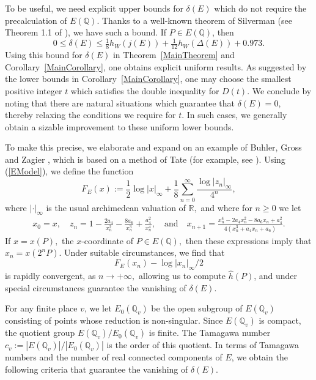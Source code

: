 \documentclass[12pt]{amsart}
\newcommand{\Q}{\mathbb{Q}}
\newcommand{\R}{\mathbb{R}}
\numberwithin{equation}{section}
\begin{document}
To be useful, we need  explicit upper bounds for $\delta(E)$ which do not require the precalculation
of $E(\Q)$. Thanks to a
well-known theorem of Silverman (see Theorem 1.1 of \cite{Silverman}), we have such a bound.
If $P\in E(\Q)$, then
\begin{equation}\label{Sbound}
0 \leq \delta(E)\leq \tfrac{1}{8}h_W(j(E))+\tfrac{1}{12}h_W(\Delta(E))+0.973.
\end{equation}
Using this bound for $\delta(E)$ in Theorem~\ref{MainTheorem} and Corollary~\ref{MainCorollary}, one obtains explicit uniform results.
As suggested by the lower bounds in Corollary~\ref{MainCorollary}, one may choose the smallest positive integer $t$ which satisfies the double inequality for $D(t)$.
We conclude by noting that there are  natural situations
which guarantee that $\delta(E)=0,$ thereby relaxing the conditions we require for $t.$ In such cases, we generally obtain a sizable improvement to these uniform lower bounds. 

To make this precise, we elaborate and expand on an example of Buhler, Gross and Zagier \cite{BGZ}, which is based on a method of Tate
(for example, see \cite{Silverman88}).
Using (\ref{EModel}), we define the function
\begin{equation}
F_E(x):=\frac{1}{2}\log| x|_{\infty}+\frac{1}{8}\sum_{n=0}^{\infty}\frac{\log |z_n|_{\infty}}{4^n},
\end{equation}
where $|\cdot|_\infty$ is the usual archimedean valuation of $\R,$ and where for $n\geq 0$ we let
\begin{align}\label{sequence}
  x_0=x,\quad  z_n=1-\frac{2a_4}{x_n^2}-\frac{8a_6}{x_n^3}+\frac{a_4^2}{x_n^4},\quad \mathrm{and} \quad x_{n+1}=\frac{x_n^{4}-2a_4x_n^2-8a_6x_n+a_4^2}{4(x_n^3+a_4x_n+a_6)}.
\end{align}
If $x=x(P),$ the $x$-coordinate of $P\in E(\Q),$ then these expressions imply that $x_{n}=x(2^{n}P)$. 
Under suitable circumstances, we find that 
$$F_E(x_n)-\log|x_n|_{\infty}/2
$$
is rapidly convergent, as $n\rightarrow +\infty,$ allowing us to compute $\widehat{h}(P)$, and under special circumstances guarantee the vanishing of $\delta(E).$

For any finite place $v$,  we let $E_0(\mathbb{Q}_v)$ be the open subgroup of $E(\mathbb{Q}_v)$ consisting of points whose reduction is non-singular. Since $E(\mathbb{Q}_v)$ is compact, the quotient group $E(\mathbb{Q}_v)/E_0(\mathbb{Q}_v)$ is finite. The Tamagawa number $c_v:= |E(\mathbb{Q}_v)|/ |E_0(\mathbb{Q}_v)|$ is the order of this quotient. In terms of Tamagawa numbers and the number of real connected components of $E$, we obtain the following criteria that guarantee the vanishing of $\delta(E)$.
 
\end{document}
